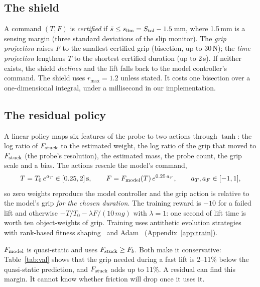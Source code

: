\subsection{The shield}
A command $(T,F)$ is \emph{certified} if $\bar s\le s_{\lim}=S_{\rm tol}-1.5$\,mm, where 1.5\,mm is a sensing margin (three
standard deviations of the slip monitor). The \emph{grip projection} raises $F$ to the smallest certified grip (bisection,
up to 30\,N); the \emph{time projection} lengthens $T$ to the shortest certified duration (up to 2\,s). If neither exists,
the shield \emph{declines} and the lift falls back to the model controller's command. The shield uses $r_{\max}=1.2$
unless stated. It costs one bisection over a one-dimensional integral, under a millisecond in our implementation.

\subsection{The residual policy}
A linear policy maps six features of the probe to two actions through $\tanh$: the log ratio of $F_{\mathrm{stuck}}$ to the estimated
weight, the log ratio of the grip that moved to $F_{\mathrm{stuck}}$ (the probe's resolution), the estimated mass, the probe count, the
grip scale and a bias. The actions rescale the model's command,
\begin{equation}
T=T_0\,e^{a_T}\in[0.25,2]\,\mathrm{s},\qquad F=F_{\rm model}(T)\,e^{0.25\,a_F},\qquad a_T,a_F\in[-1,1],
\end{equation}
so zero weights reproduce the model controller and the grip action is relative to the model's grip \emph{for the chosen
duration}. The training reward is $-10$ for a failed lift and otherwise $-T/T_0-\lambda F/(10\,mg)$ with $\lambda=1$: one
second of lift time is worth ten object-weights of grip. Training uses antithetic evolution strategies with rank-based
fitness shaping~\cite{salimans2017,mania2018} and Adam~\cite{kingma2015} (Appendix~\ref{app:train}).

\begin{remark}
$F_{\rm model}$ is quasi-static and uses $F_{\mathrm{stuck}}\ge F_b$. Both make it conservative: Table~\ref{tab:val} shows that the grip
needed during a fast lift is 2--11\% below the quasi-static prediction, and $F_{\mathrm{stuck}}$ adds up to 11\%. A residual can find this
margin. It cannot know whether friction will drop once it uses it.
\end{remark}
